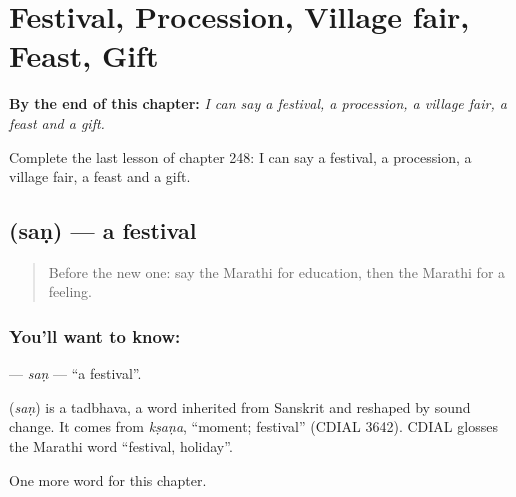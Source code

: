
\chapter{Festival, Procession, Village fair, Feast, Gift}
\label{ch:mr-festival-procession-village-fair-feast-gift}

\begin{chapteropening}
\textbf{By the end of this chapter:} \emph{I can say a festival, a procession, a village fair, a feast and a gift.}

Complete the last lesson of chapter 248: I can say a festival, a procession, a village fair, a feast and a gift.
\end{chapteropening}

\section[\texorpdfstring{\mr{सण} (saṇ)}{सण (saṇ)}]{ (saṇ) — a festival}

\label{lesson:MR-C248-san}



\begin{quote}
Before the new one: say the Marathi for education, then the Marathi for a feeling.
\end{quote}

\subsection*{You'll want to know: }
\textbf{} — \emph{saṇ} — \textquotedblleft{}a festival\textquotedblright{}.

\begin{cousinweb}
\textbf{} (\emph{saṇ}) is a tadbhava, a word inherited from Sanskrit and reshaped by sound change. It comes from \emph{kṣaṇa}, \textquotedblleft{}moment; festival\textquotedblright{} (CDIAL 3642). CDIAL glosses the Marathi word \textquotedblleft{}festival, holiday\textquotedblright{}.
\end{cousinweb}

\begin{grammarlens}[title={What you've built}]
One more word for this chapter.
\end{grammarlens}

